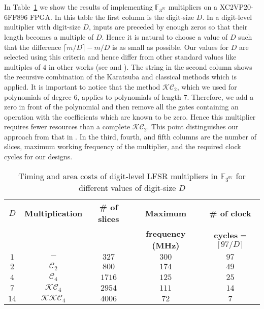\documentclass{article}
\newcommand{\F}{\mathbb{F}}
\begin{document}
In Table~\ref{tab:lfsr397costs} we show the results of implementing
$\F_{3^{97}}$ multipliers on a XC2VP20-6FF896 FPGA. In this
table the first column is the digit-size $D$. In a digit-level
multiplier with digit-size $D$, inputs are preceded by enough zeros
so that their length becomes a multiple of $D$. Hence it is natural to
choose a value of $D$ such that the difference $\lceil m / D \rceil -
m/D$ is as small as possible. Our values for $D$ are selected using
this criteria and hence differ from other standard values like
multiples of $4$ in other works (see \cite{bergua03} and
\cite{kermar05}). 
The string in the second column shows the recursive combination of the
Karatsuba and classical methods which is applied.
It is important to notice that the method $\mathcal{K}\mathcal{C}_2$,
which we used for polynomials of degree $6$, applies to polynomials of
length $7$. 
Therefore, we add a zero in front of the polynomial and then remove all
the gates containing an operation with the coefficients which are
known to be zero.
Hence this multiplier requires fewer resources than a complete
$\mathcal{K}\mathcal{C}_2$. This point distinguishes our
approach from that in \cite{gatsho06}. In the third, fourth, and fifth
columns are the number of slices, maximum working frequency of the
multiplier, and the required clock cycles for our designs.   

\begin{table}
\caption{Timing and area costs of digit-level LFSR multipliers in
  $\F_{3^{97}}$ for different values of digit-size $D$}
\begin{scriptsize}
\begin{tabular}{|c|c|c|c|c|}\hline
{$D$} & {\bf Multiplication} & {\bf \# of slices} & {\bf Maximum} & {\bf \# of clock}\\
 & & & {\bf frequency (MHz)}& {\bf cycles} = $\lceil 97/D \rceil$\\ \hline
$1$ & $-$ & $327$ & $300$ & $97$\\
$2$ & $\mathcal{C}_{2}$ & $800$ & $174$ & $49$\\
$4$ & $\mathcal{C}_{4}$ & $1716$ & $125$ & $25$\\
$7$ & $\mathcal{K}\mathcal{C}_{4}$ & $2954$ & $111$ & $14$\\
$14$ & $\mathcal{K}\mathcal{K}\mathcal{C}_{4}$ & $4006$ & $72$ & $7$\\ \hline
\end{tabular}
\end{scriptsize}
\label{tab:lfsr397costs}
\end{table}
 
\end{document}
